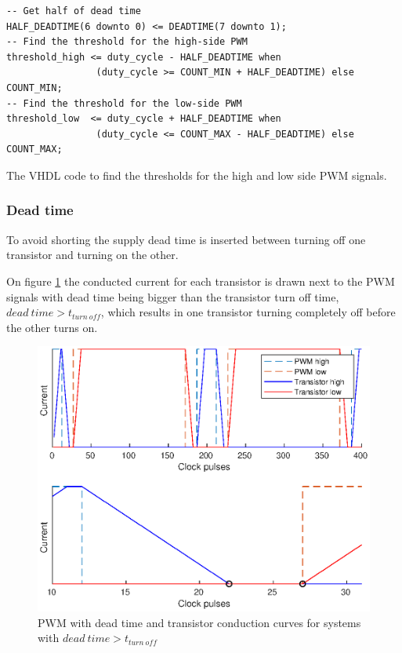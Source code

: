 \begin{verbatim}
-- Get half of dead time
HALF_DEADTIME(6 downto 0) <= DEADTIME(7 downto 1);
-- Find the threshold for the high-side PWM
threshold_high <= duty_cycle - HALF_DEADTIME when 
                (duty_cycle >= COUNT_MIN + HALF_DEADTIME) else COUNT_MIN;
-- Find the threshold for the low-side PWM
threshold_low  <= duty_cycle + HALF_DEADTIME when 
                (duty_cycle <= COUNT_MAX - HALF_DEADTIME) else COUNT_MAX;
\end{verbatim}
\begin{center}
    The VHDL code to find the thresholds for the high and low side PWM signals.
\end{center}


    
\subsubsection*{Dead time}
To avoid shorting the supply dead time is inserted between turning off one transistor and turning on the other.

On figure \ref{fig:turn_off_time1} the conducted current for each transistor is drawn next to the PWM signals with dead time being bigger than the transistor turn off time, $dead \ time > t_{turn \ off}$, which results in one transistor turning completely off before the other turns on. 

\begin{figure}[H]
	\centering
	\includegraphics[width=0.8 \textwidth]{pictures/software/turn_off_time1.eps}
	\caption{PWM with dead time and transistor conduction curves for systems with $dead \ time > t_{turn \ off}$}
	\label{fig:turn_off_time1}
\end{figure}


